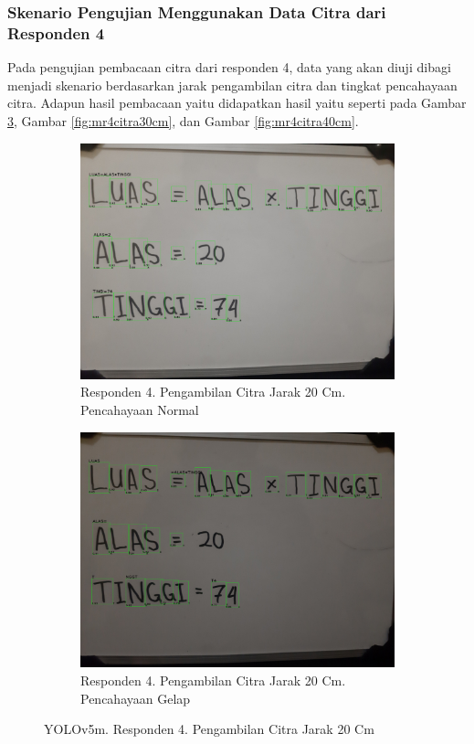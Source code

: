 \subsubsection{Skenario Pengujian Menggunakan Data Citra dari Responden 4}
\label{subsubsec:mskenarioresponden4}

Pada pengujian pembacaan citra dari responden 4, data yang akan diuji dibagi menjadi skenario berdasarkan jarak pengambilan citra dan tingkat pencahayaan citra. Adapun hasil pembacaan yaitu didapatkan hasil yaitu seperti pada Gambar \ref*{fig:mr4citra20cm}, Gambar \ref*{fig:mr4citra30cm}, dan Gambar \ref*{fig:mr4citra40cm}.

\begin{figure}[H]
  \begin{subfigure}{.5\textwidth}
    \centering
    \captionsetup{width=.8\linewidth}
    \includegraphics[width=.8\linewidth]{gambar/yolov5m/responden4/hakimaxt20cm00-result.jpg}
    \caption{Responden 4. Pengambilan Citra Jarak 20 Cm. Pencahayaan Normal}
    \label{fig:mr4tcitra20cm}
  \end{subfigure}%
  \begin{subfigure}{.5\textwidth}
    \centering
    \captionsetup{width=.8\linewidth}
    \includegraphics[width=.8\linewidth]{gambar/yolov5m/responden4/hakimaxt20cm10-result.jpg}
    \caption{Responden 4. Pengambilan Citra Jarak 20 Cm. Pencahayaan Gelap}
    \label{fig:mr4gcitra20cm}
  \end{subfigure}
  \caption{YOLOv5m. Responden 4. Pengambilan Citra Jarak 20 Cm}
  \label{fig:mr4citra20cm}
\end{figure}

